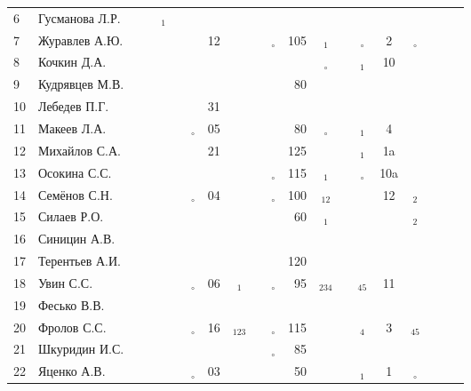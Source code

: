 \documentclass[a4paper,landscape,11pt]{article}
\newcommand*\OK{&\small \ding{51}$\!\!_\circ$} %
\newcommand*\Ok{&\small \ding{51}$\!\!_\circ$} %
\newcommand*\ok{&{\small \ding{51}}} %
\newcommand*\no{&{\small }} %
\newcommand*\da{&{\small\ding{48}$\!\!_1$}} %
\newcommand*\ab{&{\small\ding{48}$\!\!_{12}$}} %
\newcommand*\dabc{&{\small\ding{48}$\!\!_{123}$}} %
\newcommand*\db{&{\small\ding{48}$\!\!_2$}} %
\newcommand*\dd{&{\small\ding{48}$\!\!_4$}} %
\newcommand*\bd{&{\small\ding{48}$\!\!_{234}$}} %
\newcommand*\de{&{\small\ding{48}$\!\!_{45}$}} %
\begin{document}
\begin{tabular}{l|l|cccccccccrcccccccc}
 6&Гусманова Л.Р.  \ok\ok\da\ok\no\no\no  \no\no \no\no\no\no \no\no&&&\\
 7&Журавлев А.Ю.   \no\no\no\no\ok&12\ok  \ok\OK&105\da\ok\Ok&  2\Ok&&&\\
 8&Кочкин Д.А.     \no\no\no\no\ok\ok\no  \ok\no \no\Ok\no\da& 10\no&&&\\
 9&Кудрявцев М.В.  \no\no\ok\ok\no\no\no  \ok\ok& 80\ok\ok\no \no\no&&&\\
10&Лебедев П.Г.    \ok\ok\no\ok\ok&31\no  \ok\no \no\no\no\no \no\no&&&\\
11&Макеев Л.А.     \ok\ok\ok\ok\OK&05\ok  \ok\ok& 80\Ok\ok\da&  4\ok&&&\\
12&Михайлов С.А.   \no\no\ok\ok\ok&21\no  \ok\ok&125\ok\ok\da& 1a\ok&&&\\
13&Осокина С.С.    \ok\ok\ok\ok\no\no\ok  \ok\OK&115\da\no\Ok&10a\ok&&&\\
14&Семёнов С.Н.    \ok\ok\ok\ok\OK&04\ok  \ok\OK&100\ab\ok\ok& 12\db&&&\\
15&Силаев Р.О.     \ok\ok\no\no\no\no\no  \no\ok& 60\da\ok\no \no\db&&&\\
16&Синицин А.В.    \ok\ok\no\ok\no\no\no  \no\no \no\no\no\no \no\no&&\\
17&Терентьев А.И.  \ok\ok\ok\ok\no\no\no  \no\ok&120\no\no\no \no\no&&&\\
18&Увин С.С.       \ok\ok\ok\ok\OK&06\da  \ok\OK& 95\bd\ok\de& 11\ok&&&\\
19&Фесько В.В.     \no\no\no\no\no\no\no  \no\no \no\no\no\no \no\no&&&\\
20&Фролов С.С.     \ok\ok\ok\ok\OK&16\dabc\ok\OK&115\ok\ok\dd&  3\de&&&\\ 
21&Шкуридин И.С.   \ok\ok\ok\ok\ok\no\ok  \ok\OK& 85\ok\ok\no \no\ok&&&\\
22&Яценко А.В.     \ok\ok\ok\ok\OK&03\ok  \ok\ok& 50\ok\ok\da&  1\Ok&&&\\ 
\bottomrule
\end{tabular} 
\newpage
\end{document}
